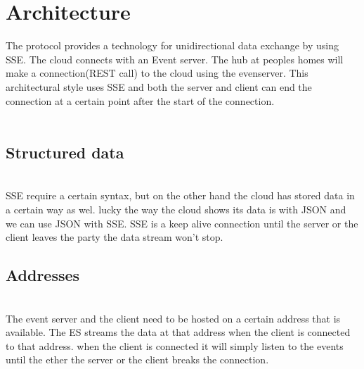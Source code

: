 \documentclass{article}
\begin{document}
\section{Architecture}\label{sec:architecture}
The protocol provides a technology for unidirectional data exchange by using SSE. The cloud connects with an Event server. The hub at peoples homes will make a connection(REST call) to the cloud using the evenserver. This architectural style uses SSE and both the server and client can end the connection at a certain point after the start of the connection. \\
\\

\subsection{Structured data}\label{sec:strucdata} \\
SSE require a certain syntax, but on the other hand the cloud has stored data in a certain way as wel. lucky the way the cloud shows its data is with JSON and we can use JSON with SSE. SSE is a keep alive connection until the server or the client leaves the party the data stream won't stop.\\

\subsection{Addresses}\label{sec:addresses} \\
The event server and the client need to be hosted on a certain address that is available. The ES streams the data at that address when the client is connected to that address. when the client is connected it will simply listen to the events until the ether the server or the client breaks the connection. \\

\cleardoublepage
\end{document}
